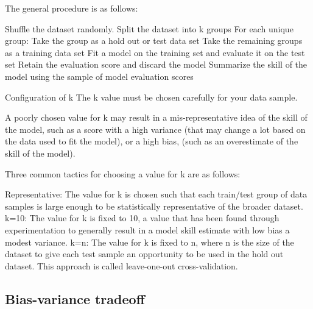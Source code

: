 The general procedure is as follows:

Shuffle the dataset randomly.
Split the dataset into k groups
For each unique group:
Take the group as a hold out or test data set
Take the remaining groups as a training data set
Fit a model on the training set and evaluate it on the test set
Retain the evaluation score and discard the model
Summarize the skill of the model using the sample of model evaluation scores



Configuration of k
The k value must be chosen carefully for your data sample.

A poorly chosen value for k may result in a mis-representative idea of the skill of the model, such as a score with a high variance (that may change a lot based on the data used to fit the model), or a high bias, (such as an overestimate of the skill of the model).

Three common tactics for choosing a value for k are as follows:

Representative: The value for k is chosen such that each train/test group of data samples is large enough to be statistically representative of the broader dataset.
k=10: The value for k is fixed to 10, a value that has been found through experimentation to generally result in a model skill estimate with low bias a modest variance.
k=n: The value for k is fixed to n, where n is the size of the dataset to give each test sample an opportunity to be used in the hold out dataset. This approach is called leave-one-out cross-validation.

\subsection{Bias-variance tradeoff}